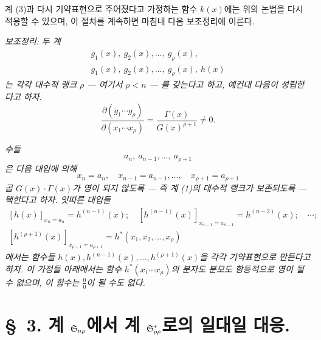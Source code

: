 계 (3)과 다시 기약표현으로 주어졌다고 가정하는 함수 $k(x)$에는 위의 논법을 다시 적용할 수 있으며, 이 절차를 계속하면 마침내 다음 보조정리에 이른다.

\emph{보조정리: 두 계}
\[
\begin{array}{c}
g_1(x),\ g_2(x),\ldots,\ g_\rho(x),\\
g_1(x),\ g_2(x),\ldots,\ g_\rho(x),\ h(x)
\end{array}
\]
\emph{는 각각 대수적 랭크 $\rho$ --- 여기서 $\rho<n$ --- 를 갖는다고 하고, 예컨대 다음이 성립한다고 하자.}
\[
 \frac{\partial(g_1\cdots g_\rho)}
 {\partial(x_1\cdots x_\rho)}
 =\frac{\Gamma(x)}{G(x)^{\rho+1}}\ne0.
\]

\emph{수들}
\[
 a_n,\ a_{n-1},\ldots,\ a_{\rho+1}
\]
\emph{은 다음 대입에 의해}
\[
 x_n=a_n,\quad x_{n-1}=a_{n-1},\ldots,\quad x_{\rho+1}=a_{\rho+1}
\]
\emph{곱 $G(x)\cdot\Gamma(x)$가 영이 되지 않도록 --- 즉 계 (1)의 대수적 랭크가 보존되도록 --- 택한다고 하자. 잇따른 대입들}
\[
\begin{array}{c}
[h(x)]_{x_n=a_n}=h^{(n-1)}(x);\quad
[h^{(n-1)}(x)]_{x_{n-1}=a_{n-1}}=h^{(n-2)}(x);\quad\cdots;\\[0.25em]
[h^{(\rho+1)}(x)]_{x_{\rho+1}=a_{\rho+1}}=h^*(x_1,x_2,\ldots,x_\rho)
\end{array}
\]
\emph{에서는 함수들 $h(x),h^{(n-1)}(x),\ldots,h^{(\rho+1)}(x)$을 각각 기약표현으로 만든다고 하자. 이 가정들 아래에서는 함수 $h^*(x_1\cdots x_\rho)$의 분자도 분모도 항등적으로 영이 될 수 없으며, 이 함수는 $\frac00$이 될 수도 없다.}

\section*{\S\ 3. 계 $\mathfrak S_{n\rho}$에서 계 $\mathfrak S^*_{\rho\rho}$로의 일대일 대응.}

